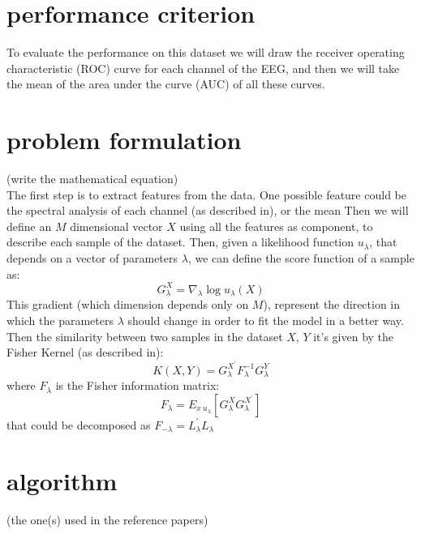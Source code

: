\documentclass[final,leqno,onefignum,onetabnum]{siamltexmm}
\begin{document}
  \section{performance criterion}
  To evaluate the performance on this dataset we will draw the receiver operating characteristic (ROC) curve for each channel of the EEG, and then we will take the mean of the area under the curve (AUC) of all these curves. 


  \section{problem formulation}
  (write the mathematical equation)\\
  The first step is to extract features from the data. One possible feature could be the spectral analysis of each channel (as described in\cite{features1}), or the mean  Then we will define an $M$ dimensional vector $X$ using all the features as component, to describe each sample of the dataset. Then, given a likelihood function $u_\lambda$, that depends on  a vector of parameters $\lambda$, we can define the score function of a sample as:
  \begin{equation}\label{Glambda}
    G_\lambda^X=\nabla_{\lambda }\log u_\lambda(X)  
  \end{equation}
  This gradient (which dimension depends only on $M$), represent the direction in which the parameters $\lambda$ should change in order to fit the model in a better way.
  Then the similarity between two samples in the dataset $X$, $Y$ it's given by the Fisher Kernel (as described in\cite{fisher}):
  \begin{equation}
    K(X,Y)=G_\lambda^{X^{'}}F_\lambda^{-1} G_\lambda^Y
  \end{equation} 
  where $F_\lambda$ is the Fisher information matrix:
  \begin{equation}
    F_\lambda=E_{x~u_\lambda}[ G_\lambda^XG_\lambda^{X^{'}}]
  \end{equation} 
  that could be decomposed as $F_{-\lambda}=L_\lambda^{'}L_\lambda$


  \section{algorithm}
  (the one(s) used in the reference papers)
\end{document}
